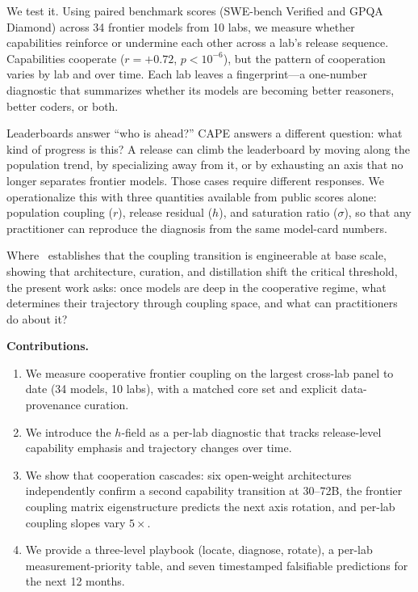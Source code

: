 \documentclass{article}
\begin{document}
We test it. Using paired benchmark scores (SWE-bench Verified and GPQA Diamond) across
34 frontier models from 10 labs, we measure whether capabilities reinforce or undermine
each other across a lab's release sequence.
Capabilities cooperate ($r = +0.72$, $p < 10^{-6}$),
but the pattern of cooperation varies by lab and over time.
Each lab leaves a fingerprint---a one-number diagnostic that summarizes
whether its models are becoming better reasoners, better coders, or both.

Leaderboards answer ``who is ahead?''
CAPE answers a different question: what kind of progress is this?
A release can climb the leaderboard by moving along the population trend,
by specializing away from it,
or by exhausting an axis that no longer separates frontier models.
Those cases require different responses.
We operationalize this with three quantities available from public scores alone:
population coupling ($r$), release residual ($h$), and saturation ratio ($\sigma$), so
that any practitioner can reproduce the diagnosis from the same model-card numbers.

Where~\cite{amin2026lying} establishes that the coupling transition is engineerable
at base scale, showing that architecture, curation, and distillation
shift the critical threshold, the present work asks:
once models are deep in the cooperative regime,
what determines their trajectory through coupling space,
and what can practitioners do about it?

\noindent\textbf{Contributions.}
\begin{enumerate}[nosep,leftmargin=*]
  \item We measure cooperative frontier coupling on the largest cross-lab panel to date
        (34 models, 10 labs), with a matched core set and explicit data-provenance curation.
  \item We introduce the $h$-field as a per-lab diagnostic that tracks
        release-level capability emphasis and trajectory changes over time.
  \item We show that cooperation cascades: six open-weight architectures independently
        confirm a second capability transition at 30--72B,
        the frontier coupling matrix eigenstructure predicts the next axis rotation,
        and per-lab coupling slopes vary $5\times$.
  \item We provide a three-level playbook (locate, diagnose, rotate),
        a per-lab measurement-priority table,
        and seven timestamped falsifiable predictions for the next 12 months.
\end{enumerate}
\end{document}
